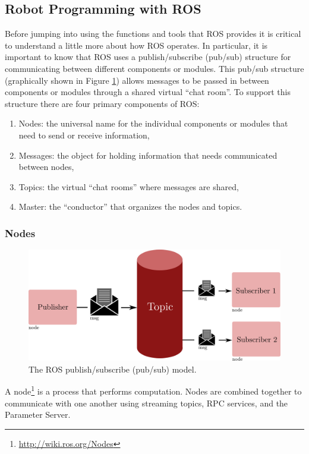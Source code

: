 \subsection{Robot Programming with ROS}
Before jumping into using the functions and tools that ROS provides it is critical to understand a little more about how ROS operates. In particular, it is important to know that ROS uses a publish/subscribe (pub/sub) structure for communicating between different components or modules. This pub/sub structure (graphically shown in Figure \ref{chat_room}) allows messages to be passed in between components or modules through a shared virtual ``chat room''. To support this structure there are four primary components of ROS:
\begin{enumerate}
    \item Nodes: the universal name for the individual components or modules that need to send or receive information,
    \item Messages: the object for holding information that needs communicated between nodes,
    \item Topics: the virtual ``chat rooms'' where messages are shared,
    \item Master: the ``conductor'' that organizes the nodes and topics.
\end{enumerate}

\subsubsection{Nodes}

\begin{figure}[t] 
    \centering 
    \includegraphics[width=0.65\linewidth]{tex/figs/ch02_figs/pub_sub.png}
    \caption{The ROS publish/subscribe (pub/sub) model.}
    \label{chat_room} 
\end{figure}

\begin{definition}[Node]
A node\footnote{\url{http://wiki.ros.org/Nodes}} is a process that performs computation. Nodes are combined together to communicate with one another using streaming topics, RPC services, and the Parameter Server.
\end{definition}

